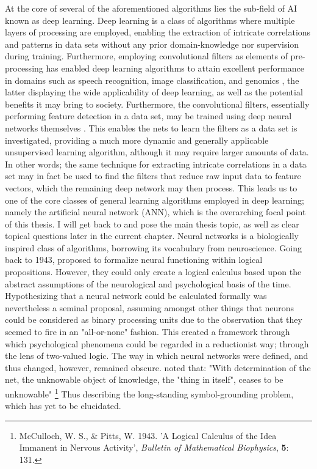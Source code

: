 At the core of several of the aforementioned algorithms lies the sub-field of AI known as deep learning. Deep learning is a class of algorithms where multiple layers of processing are employed, enabling the extraction of intricate correlations and patterns in data sets without any prior domain-knowledge nor supervision during training. Furthermore, employing convolutional filters as elements of pre-processing has enabled deep learning algorithms to attain excellent performance in domains such as speech recognition, image classification, and genomics \citep{LeCun2015}, the latter displaying the wide applicability of deep learning, as well as the potential benefits it may bring to society. Furthermore, the convolutional filters, essentially performing feature detection in a data set, may be trained using deep neural networks themselves \citep{LeCun2015}. This enables the nets to learn the filters as a data set is investigated, providing a much more dynamic and generally applicable unsupervised learning algorithm, although it may require larger amounts of data. In other words; the same technique for extracting intricate correlations in a data set may in fact be used to find the filters that reduce raw input data to feature vectors, which the remaining deep network may then process. This leads us to one of the core classes of general learning algorithms employed in deep learning; namely the artificial neural network (ANN), which is the overarching focal point of this thesis. I will get back to and pose the main thesis topic, as well as clear topical questions later in the current chapter.
Neural networks is a biologically inspired class of algorithms, borrowing its vocabulary from neuroscience. Going back to 1943, \cite{McCulloch1943} proposed to formalize neural functioning within logical propositions.
However, they could only create a logical calculus based upon the abstract assumptions of the neurological and psychological basis of the time. Hypothesizing that a neural network could be calculated formally was nevertheless a seminal proposal, assuming amongst other things that neurons could be considered as binary processing units due to the observation that they seemed to fire in an "all-or-none" fashion. This created a framework through which psychological phenomena could be regarded in a reductionist way; through the lens of two-valued logic. The way in which neural networks were defined, and thus changed, however, remained obscure. \cite{McCulloch1943} noted that: "With determination of the net, the unknowable object of knowledge, the "thing in itself", ceases to be unknowable"
\footnote{McCulloch, W. S., \& Pitts, W. 1943. 'A Logical Calculus of the Idea Immanent in Nervous Activity', \textit{Bulletin of Mathematical Biophysics}, \textbf{5}: 131.}
Thus describing the long-standing symbol-grounding problem, which has yet to be elucidated.

